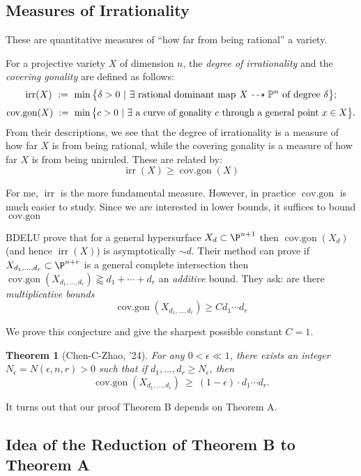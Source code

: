 \documentclass[12pt]{article}
\theoremstyle{plain}
\newtheorem{Lthm}{Theorem}
\DeclareMathOperator{\irr}{irr}
\DeclareMathOperator{\cov}{cov.gon}
\newcommand{\mb}[1]{\mathbb{#1}}
\DeclareMathOperator{\cg}{cov.gon}
\begin{document}
\subsection{Measures of Irrationality}

{\color{red} These are quantitative measures of ``how far from being rational'' a variety. }

For a projective variety $X$ of dimension $n$, the \emph{degree of irrationality} and the \emph{covering gonality} are defined as follows:
\[ \irr(X)\ :=\ \min\big\{\delta>0\ |\ \exists\textup{ rational dominant map } X\dashrightarrow \mb{P}^n\textup{ of degree }\delta\big\}; \]
\[ \cov(X)\ :=\ \min\big\{c>0\ |\ \exists\textup{ a curve of gonality } c \textup{ through a general point } x\in X\big\}.\]
{\color{red} From their descriptions, we see that the degree of irrationality is a measure of how far $X$ is from being rational, while the covering gonality is a measure of how far $X$ is from being uniruled.} These are related by: 
\[ \irr(X) \geq \cg(X) \]

{\color{red} For me, $\irr$ is the more fundamental measure. However, in practice $\cg$ is much easier to study. Since we are interested in lower bounds, it suffices to bound $\cg$}

BDELU prove that for a general hypersurface $X_d \subset \P^{n+1}$ then $\cg(X_d)$ (and hence $\irr(X)$) is asymptotically $\sim d$. Their method can prove if $X_{d_1, \dots, d_r} \subset \P^{n+r}$ is a general complete intersection then $\cg(X_{d_1, \dots, d_r}) \gtrapprox d_1 + \cdots + d_r$ an \textit{additive} bound. They ask: are there \textit{multiplicative bounds}
\[ \cg(X_{d_1, \dots, d_r}) \ge C d_1 \cdots d_r \]

{\color{red} We prove this conjecture and give the sharpest possible constant $C = 1$.}

\begin{Lthm}[Chen-C-Zhao, '24]
For any $0 < \epsilon \ll 1$, there exists an integer $N_{\epsilon} = N(\epsilon, n, r) > 0$ such that if $d_1, \dots, d_r \ge N_\epsilon$, then
\[ \cg(X_{d_1, \dots, d_r}) \ \geq \  (1-\epsilon) \cdot d_{1} \cdots d_{r}. \]
\end{Lthm}

{\color{red} It turns out that our proof Theorem B depends on Theorem A. }

\subsection{Idea of the Reduction of Theorem B to Theorem A}
\end{document}
